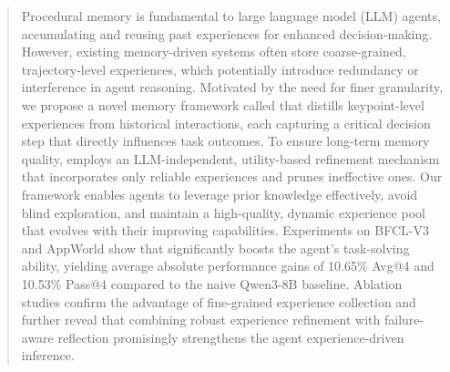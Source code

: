\begin{abstract}
Procedural memory is fundamental to large language model (LLM) agents, accumulating and reusing past experiences for enhanced decision-making. 
However, existing memory-driven systems often store coarse-grained, trajectory-level experiences, which potentially introduce redundancy or interference in agent reasoning. 
Motivated by the need for finer granularity, we propose a novel memory framework called {\ours} that distills keypoint-level experiences from historical interactions, each capturing a critical decision step that directly influences task outcomes. 
To ensure long-term memory quality, {\ours} employs an LLM-independent, utility-based refinement mechanism that incorporates only reliable experiences and prunes ineffective ones. 
Our framework enables agents to leverage prior knowledge effectively, avoid blind exploration, and maintain a high-quality, dynamic experience pool that evolves with their improving capabilities. 
Experiments on BFCL-V3 and AppWorld show that {\ours} significantly boosts the agent's task-solving ability, yielding average absolute performance gains of 10.65\% Avg@4 and 10.53\% Pass@4 compared to the naive Qwen3-8B baseline. 
Ablation studies confirm the advantage of fine-grained experience collection and further reveal that combining robust experience refinement with failure-aware reflection promisingly strengthens the agent experience-driven inference. 
\end{abstract}


